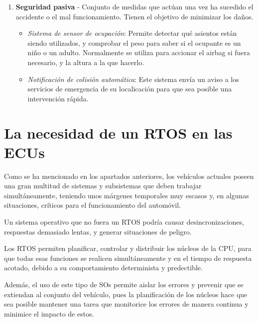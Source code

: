 \begin{enumerate}
    \item \textbf{Seguridad pasiva} - Conjunto de medidas que actúan una vez ha sucedido el accidente o el mal funcionamiento. Tienen el objetivo de minimizar los daños.

    \begin{itemize}
        \item \textit{Sistema de sensor de ocupación}: Permite detectar qué asientos están siendo utilizados, y comprobar el peso para saber si el ocupante es un niño o un adulto. Normalmente se utiliza para accionar el airbag si fuera necesario, y la altura a la que hacerlo.

        \item \textit{Notificación de colisión automática}: Este sistema envía un aviso a los servicios de emergencia de su localicación para que sea posible una intervención rápida. \cite{colision}
    \end{itemize}
\end{enumerate}




\section{La necesidad de un RTOS en las ECUs}

Como se ha mencionado en los apartados anteriores, los vehículos actuales poseen una gran multitud de sistemas y subsistemas que deben trabajar simultáneamente, teniendo unos márgenes temporales muy escasos y, en algunas situaciones, críticos para el funcionamiento del automóvil. 

Un sistema operativo que no fuera un RTOS podría causar desincronizaciones, respuestas demasiado lentas, y generar situaciones de peligro. 

Los RTOS permiten planificar, controlar y distribuir los núcleos de la CPU, para que todas esas funciones se realicen simultáneamente y en el tiempo de respuesta acotado, debido a su comportamiento determinista y predectible. 

Además, el uso de este tipo de SOs permite aislar los errores y prevenir que se extiendan al conjunto del vehículo, pues la planificación de los núcleos hace que sea posible mantener una tarea que monitorice los errores de manera continua y minimice el impacto de estos.